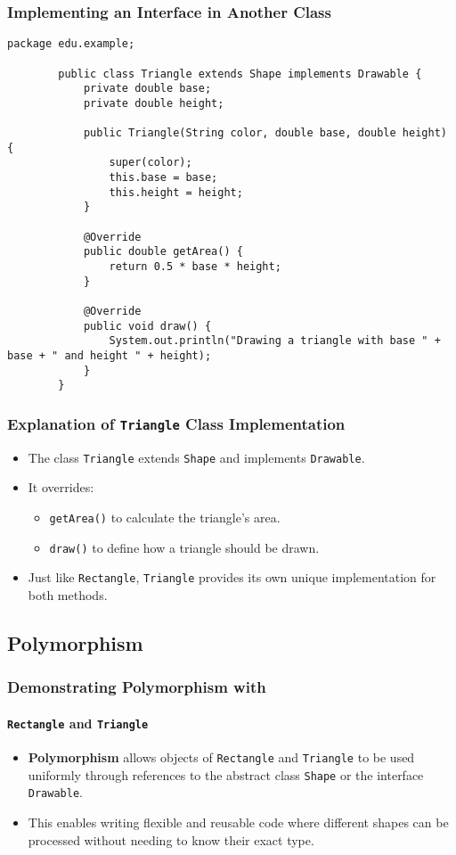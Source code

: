\documentclass[aspectratio=169, table]{beamer}
\begin{document}
\begin{frame}[fragile]
	\frametitle{Implementing an Interface in Another Class}
	
	\begin{lstlisting}[style=JavaStyle, caption={Implementing an Interface: \texttt{Triangle.java}}]
		package edu.example;
		
		public class Triangle extends Shape implements Drawable {
			private double base;
			private double height;
			
			public Triangle(String color, double base, double height) {
				super(color);
				this.base = base;
				this.height = height;
			}
			
			@Override
			public double getArea() {
				return 0.5 * base * height;
			}
			
			@Override
			public void draw() {
				System.out.println("Drawing a triangle with base " + base + " and height " + height);
			}
		}
	\end{lstlisting}
\end{frame}



\begin{frame}[fragile]
	\frametitle{\LARGE{Explanation of \texttt{Triangle} Class Implementation}}
	
	\begin{itemize}
		\item The class \texttt{Triangle} extends \texttt{Shape} and implements \texttt{Drawable}.
		\item It overrides:
		\begin{itemize}
			\item \texttt{getArea()} to calculate the triangle's area.
			\item \texttt{draw()} to define how a triangle should be drawn.
		\end{itemize}
		\item Just like \texttt{Rectangle}, \texttt{Triangle} provides its own unique implementation for both methods.
	\end{itemize}
\end{frame}

\subsection{Polymorphism}
\begin{frame}[fragile]
	\frametitle{Demonstrating Polymorphism with}
	\framesubtitle{\texttt{Rectangle} and \texttt{Triangle}}
	
	\begin{itemize}
		\item \textbf{Polymorphism} allows objects of \texttt{Rectangle} and \texttt{Triangle} to be used uniformly through references to the abstract class \texttt{Shape} or the interface \texttt{Drawable}.
		\item This enables writing flexible and reusable code where different shapes can be processed without needing to know their exact type.
	\end{itemize}
\end{frame}
\end{document}
